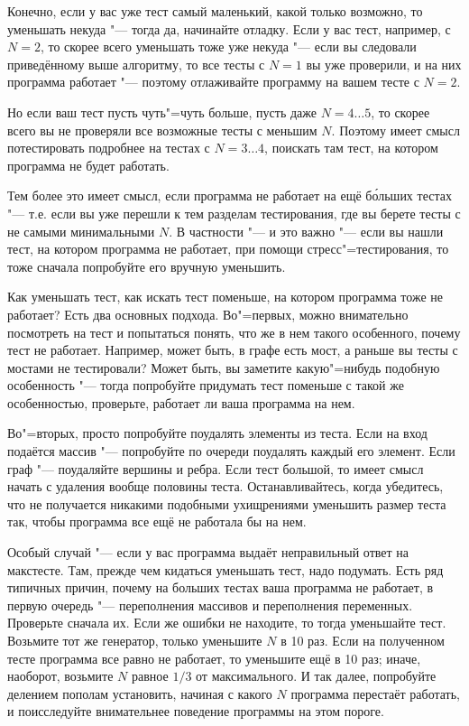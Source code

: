 \documentclass[a4paper,10pt]{problems}
\begin{document}
Конечно, если у вас уже тест самый маленький, какой только возможно, то уменьшать некуда "--- тогда да, начинайте отладку. 
Если у вас тест, например, с $N=2$, то скорее всего уменьшать тоже уже некуда "--- если вы следовали приведённому выше алгоритму,
то все тесты с $N=1$ вы уже проверили, и на них программа работает "--- поэтому отлаживайте программу на вашем тесте с $N=2$.

Но если ваш тест пусть чуть"=чуть больше, пусть даже $N=4\dots5$, то скорее всего вы не проверяли все возможные тесты с меньшим $N$. 
Поэтому имеет смысл потестировать подробнее на тестах с $N=3\dots4$, поискать там тест, на котором программа не будет работать.

Тем более это имеет смысл, если программа не работает на ещё б\'{о}льших тестах "--- т.е. если вы уже перешли к тем разделам тестирования,
где вы берете тесты с не самыми минимальными $N$. 
В частности "--- и это важно "--- если вы нашли тест, на котором программа не работает, при помощи стресс"=тестирования,
то тоже сначала попробуйте его вручную уменьшить. 

Как уменьшать тест, как искать тест поменьше, на котором программа тоже не работает?
Есть два основных подхода. 
Во"=первых, можно внимательно посмотреть на тест и попытаться понять, что же в нем такого особенного, почему тест не работает. 
Например, может быть, в графе есть мост, а раньше вы тесты с мостами не тестировали? 
Может быть, вы заметите какую"=нибудь подобную особенность "--- тогда попробуйте придумать тест поменьше с такой же особенностью,
проверьте, работает ли ваша программа на нем.

Во"=вторых, просто попробуйте поудалять элементы из теста. Если на вход подаётся массив "--- попробуйте по очереди поудалять каждый его элемент.
Если граф "--- поудаляйте вершины и ребра. 
Если тест большой, то имеет смысл начать с удаления вообще половины теста.
Останавливайтесь, когда убедитесь, что не получается никакими подобными ухищрениями уменьшить размер теста так, чтобы программа все ещё не работала бы на нем.

Особый случай "--- если у вас программа выдаёт неправильный ответ на макстесте. 
Там, прежде чем кидаться уменьшать тест, надо подумать. 
Есть ряд типичных причин, почему на больших тестах ваша программа не работает, в первую очередь "--- переполнения массивов и переполнения переменных.
Проверьте сначала их.
Если же ошибки не находите, то тогда уменьшайте тест. 
Возьмите тот же генератор, только уменьшите $N$ в 10 раз.
Если на полученном тесте программа все равно не работает, то уменьшите ещё в 10 раз; иначе, наоборот, возьмите $N$ равное $1/3$ от максимального.
И так далее, попробуйте делением пополам установить, начиная с какого $N$ программа перестаёт работать, и поисследуйте внимательнее поведение программы
на этом пороге.
\end{document}
